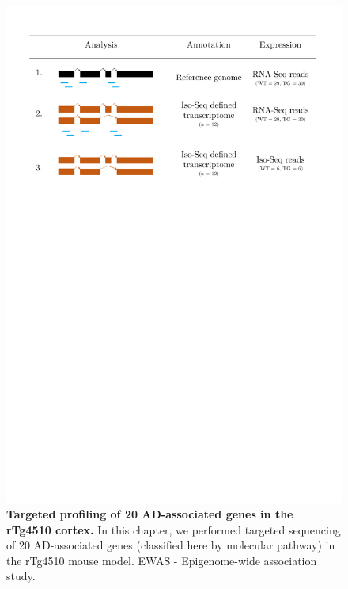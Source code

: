 \begin{figure}[htp]
	\centering
	\includegraphics[page=5,trim={1cm 32cm 1cm 0cm},clip,scale = 0.45]{Figures/Tg4510_diff_figures.pdf}
	\captionsetup{width=0.95\textwidth}
	\caption[Targeted profiling of 20 AD-associated genes in the rTg4510 cortex]%
	{\textbf{Targeted profiling of 20 AD-associated genes in the rTg4510 cortex.} In this chapter, we performed targeted sequencing of 20 AD-associated genes (classified here by molecular pathway) in the rTg4510 mouse model. EWAS - Epigenome-wide association study.}
	\label{fig:targeted_genes}
\end{figure}


